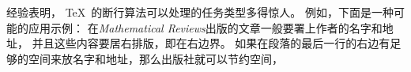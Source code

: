 \ddanger 经验表明， \TeX\ 的断行算法可以处理的任务类型多得惊人。%
例如，下面是一种可能的应用示例：
在{\sl{Mathematical Reviews}\/\null}出版的文章一般要署上作者的名字和地址，
并且这些内容要居右排版，即在右边界。%
如果在段落的最后一行的右边有足够的空间来放名字和地址，那么出版社就可以节约空间，
